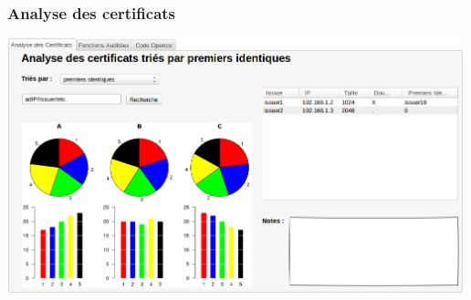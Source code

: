 \documentclass[a4paper,11pt,french]{article}
\begin{document}
\subsubsection{Analyse des certificats}
\begin{center}
\includegraphics[width=500px]{Framework/AnalyseCertificats.png}
\end{center}
\end{document}
